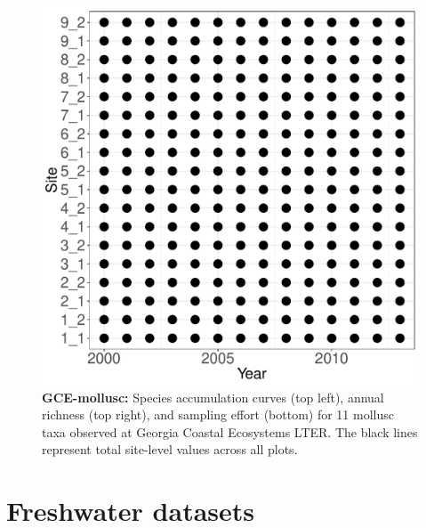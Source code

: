 \documentclass[11pt, oneside]{article}
\begin{document}
\begin{figure}[h!]
\includegraphics[scale = 0.4]{gce-mollusc-compagnoni_spatiotemporal_sampling_effort.pdf}
\caption{{\bf GCE-mollusc:} Species accumulation curves (top left),  annual richness (top right), and sampling effort (bottom)  for 11 mollusc taxa observed at Georgia Coastal Ecosystems LTER. The black lines represent total site-level values across all plots.}
\label{gce-mollusc}
\end{figure}

\newpage

\section {Freshwater datasets}
\end{document}
